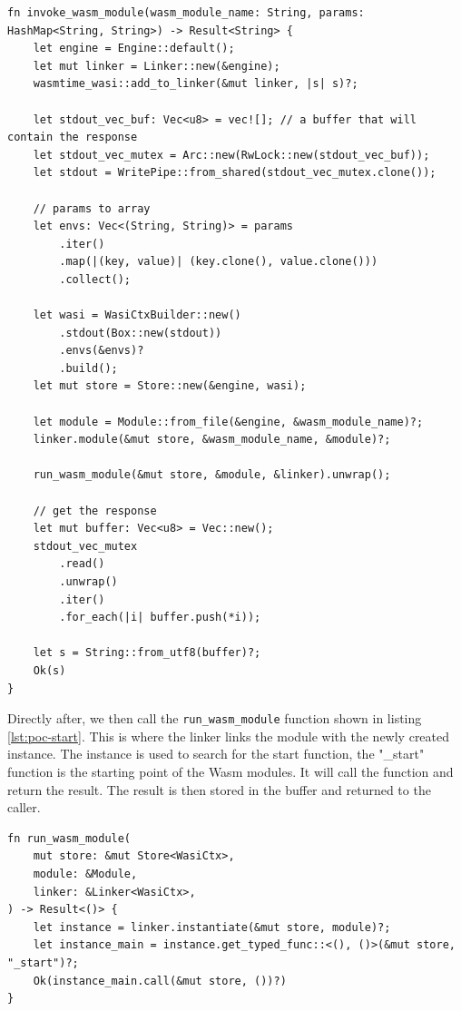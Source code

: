 \begin{lstlisting}[frame=lines, style=Rust, caption={invocation function}, showstringspaces=false, label={lst:poc-invocation}, captionpos=b]
fn invoke_wasm_module(wasm_module_name: String, params: HashMap<String, String>) -> Result<String> {
    let engine = Engine::default();
    let mut linker = Linker::new(&engine);
    wasmtime_wasi::add_to_linker(&mut linker, |s| s)?;

    let stdout_vec_buf: Vec<u8> = vec![]; // a buffer that will contain the response
    let stdout_vec_mutex = Arc::new(RwLock::new(stdout_vec_buf));
    let stdout = WritePipe::from_shared(stdout_vec_mutex.clone());

    // params to array
    let envs: Vec<(String, String)> = params
        .iter()
        .map(|(key, value)| (key.clone(), value.clone()))
        .collect();

    let wasi = WasiCtxBuilder::new()
        .stdout(Box::new(stdout))
        .envs(&envs)?
        .build();
    let mut store = Store::new(&engine, wasi);

    let module = Module::from_file(&engine, &wasm_module_name)?;
    linker.module(&mut store, &wasm_module_name, &module)?;

    run_wasm_module(&mut store, &module, &linker).unwrap();

    // get the response
    let mut buffer: Vec<u8> = Vec::new();
    stdout_vec_mutex
        .read()
        .unwrap()
        .iter()
        .for_each(|i| buffer.push(*i));

    let s = String::from_utf8(buffer)?;
    Ok(s)
}
\end{lstlisting}
%
Directly after, we then call the \texttt{run\_wasm\_module} function shown in listing \ref{lst:poc-start}. This is where the linker links the module with the newly created instance. The instance is used to search for the start function, the "\_start" function is the starting point of the Wasm modules. It will call the function and return the result. The result is then stored in the buffer and returned to the caller.
%
\begin{lstlisting}[frame=lines, style=Rust, caption={calling the wasm start function}, showstringspaces=false, label={lst:poc-start}, captionpos=b]
fn run_wasm_module(
    mut store: &mut Store<WasiCtx>,
    module: &Module,
    linker: &Linker<WasiCtx>,
) -> Result<()> {
    let instance = linker.instantiate(&mut store, module)?;
    let instance_main = instance.get_typed_func::<(), ()>(&mut store, "_start")?;
    Ok(instance_main.call(&mut store, ())?)
}
\end{lstlisting}
